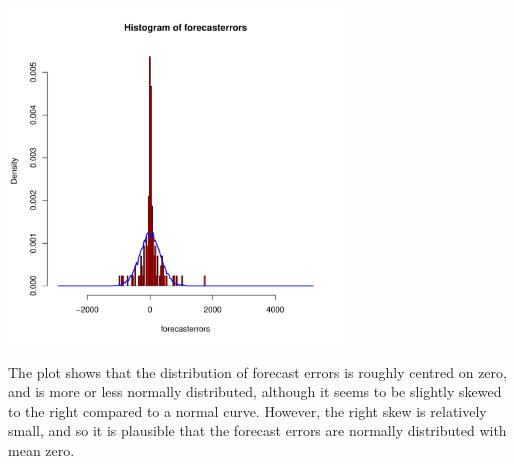 \begin{center}
\includegraphics[width=0.7\maxwidth,height=3.5in]{figure/listings-HWComputations6}
\end{center}

The plot shows that the distribution of forecast errors is roughly centred on zero, and is more or less normally
distributed, although it seems to be slightly skewed to the right compared to a normal curve. However, the right
skew is relatively small, and so it is plausible that the forecast errors are normally distributed with mean zero.

%
%
%
%
%

